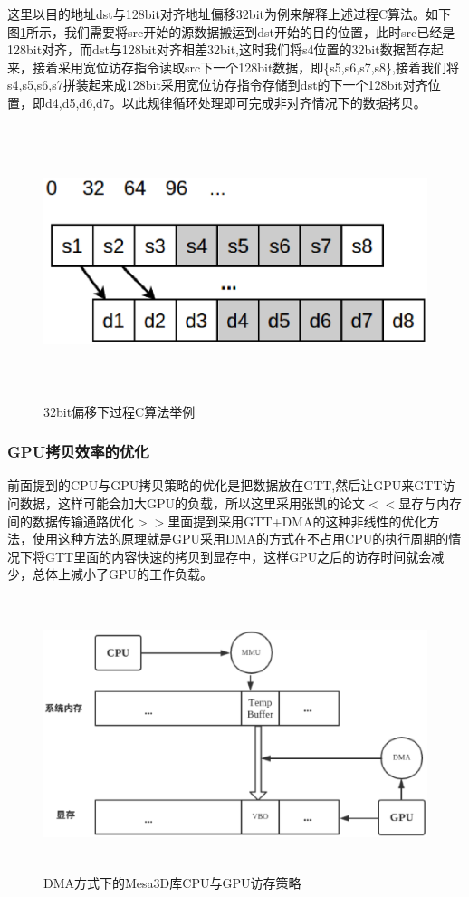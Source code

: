 \begin{itemize}
这里以目的地址dst与128bit对齐地址偏移32bit为例来解释上述过程C算法。如下图\ref{fig:offset32}所示，我们需要将src开始的源数据搬运到dst开始的目的位置，此时src已经是128bit对齐，而dst与128bit对齐相差32bit,这时我们将s4位置的32bit数据暂存起来，接着采用宽位访存指令读取src下一个128bit数据，即\{s5,s6,s7,s8\},接着我们将s4,s5,s6,s7拼装起来成128bit采用宽位访存指令存储到dst的下一个128bit对齐位置，即{d4,d5,d6,d7}。以此规律循环处理即可完成非对齐情况下的数据拷贝。


\begin{figure}[H] 
  \centering
  \includegraphics[width=12cm,height=8cm]{figures/chap03/offset32}
  \caption{32bit偏移下过程C算法举例}
  \label{fig:offset32}
\end{figure}

\subsubsection{GPU拷贝效率的优化}

前面提到的CPU与GPU拷贝策略的优化是把数据放在GTT,然后让GPU来GTT访问数据，这样可能会加大GPU的负载，所以这里采用张凯的论文$<<$显存与内存间的数据传输通路优化$>>$\cite{gpu-cpu-data}里面提到采用GTT+DMA的这种非线性的优化方法，使用这种方法的原理就是GPU采用DMA的方式在不占用CPU的执行周期的情况下将GTT里面的内容快速的拷贝到显存中，这样GPU之后的访存时间就会减少，总体上减小了GPU的工作负载。

\begin{figure}[H] 
  \centering
  \includegraphics[width=12cm,height=8cm]{figures/chap03/gpu-dma}
  \caption{DMA方式下的Mesa3D库CPU与GPU访存策略}
  \label{fig:gpu-dma}
\end{figure}


\end{itemize}
